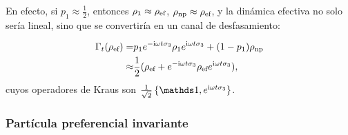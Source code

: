 En efecto, si $p_{1}\approx\frac{1}{2}$, entonces $\rho_{1}\approx\rho_{\text{ef}}$, $\rho_{\text{np}}\approx\rho_{\text{ef}}$, y la dinámica efectiva no solo sería lineal, sino que se convertiría en un canal de desfasamiento:

\begin{align}
    \Gamma_{t}(\rho_{\text{ef}})=&p_{1}e^{-\text{i}\omega t \sigma_{3}}\rho_{1}e^{\text{i}\omega t \sigma_{3}}+(1-p_{1})\rho_{\text{np}}\nonumber\\
    \approx&\frac{1}{2}(\rho_{\text{ef}}+e^{-\text{i}\omega t \sigma_{3}}\rho_{\text{ef}} e^{\text{i}\omega t \sigma_{3}}),\nonumber
\end{align}
cuyos operadores de Kraus son $\frac{1}{\sqrt{2}}\left\{\Id, e^{\rmi\omega t \pauli{3}} \right\}$.

\subsubsection{Partícula preferencial invariante}

